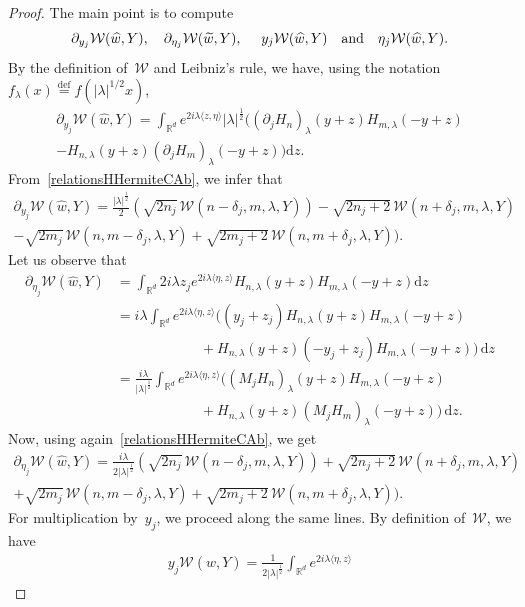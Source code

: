 \documentclass[10pt]{amsart}
\theoremstyle{definition}\newtheorem{defi}[theo]{Definition}\newtheorem{rema}[theo]{Remark}\newtheorem{exam}[theo]{Example}\newtheorem{exem}[theo]{Example}\newtheorem{nota}[theo]{Notation}
\newcommand{\lam}{\lambda}
\newcommand{\wt}{\widetilde}
\newcommand{\wh}{\widehat}
\newcommand*\cW{\mathcal{W}}
\newcommand*\R{\mathbb{R}}
\newcommand{\andf}{\quad\hbox{and}\quad}
\newcommand*\eqdefa{\overset{\mathrm{def}}{=}}
\newcommand*{\dd}{\mathrm{d}}
\newcommand{\dz}{\dd z}
\begin{document}
\begin{proof}
The main point is to compute
\[
\partial_{y_j} \cW(\wh w,Y),\quad\partial_{\eta_j} \cW(\wt w,Y),\quad\ y_j \cW(\wh w,Y)\andf \eta_j \cW(\wh w,Y).
\]
By the definition of~$\cW$ and Leibniz's rule, we have, using the notation $f_\lam(x)\eqdefa f(|\lam|^{1/2}x)$,
\begin{multline*}
\partial_{y_j} \cW(\wh w,Y) = \int_{\R^d} e^{2i\lam\langle z,\eta\rangle } |\lam|^{\frac 12}
\Big((\partial_jH_n)_{\lam} (y+z) H_{m,\lam} (-y+z) \\ -H_{n,\lam} (y+z) (\partial_jH_m)_\lam (-y+z) \Big)\dz.
\end{multline*}
From~\eqref{relationsHHermiteCAb}, we infer that
\begin{multline}\label{actionX_jonFHdemoeq1}
\!\!\partial_{y_j} \cW(\wh w,Y) = \frac {|\lam|^{\frac 12}} 2 (\sqrt {2n_j}\, \cW(n\!-\!\delta_j,m,\lam,Y)) -\sqrt {2n_j\!+\!2}\, \cW(n\!+\!\delta_j,m,\lam,Y) \\
-\sqrt {2m_j}\,\cW(n,m-\delta_j,\lam,Y) +\sqrt {2m_j+2}\,\cW(n,m+\delta_j,\lam,Y)).\!\!
\end{multline}
Let us observe that
\[
\begin{aligned}
\partial_{\eta_j} \cW(\wh w,Y) & = \int_{\R^d} 2i\lam z_j e^{2i\lam\langle \eta,z\rangle} H_{n,\lam}(y+z)H_{m,\lam} (-y+z) \dz\\
& = i\lam \int_{\R^d} e^{2i\lam\langle \eta,z\rangle}((y_j+z_j) H_{n,\lam}(y+z)H_{m,\lam} (-y+z) \\
& \qquad\qquad\qquad + H_{n,\lam}(y+z)(-y_j+z_j)H_{m,\lam} (-y+z))\,\dz\\
&= \frac {i\lam} {|\lam|^{\frac 12} }\int_{\R^d}e^{2i\lam\langle \eta,z\rangle} ((M_jH_{n})_\lam(y+z)H_{m,\lam} (-y+z) \\
& \qquad\qquad\qquad +H_{n,\lam}(y+z) (M_jH_m)_\lam(-y+z))\,\dz.
\end{aligned}
\]
Now, using again~\eqref{relationsHHermiteCAb}, we get
\begin{multline}\label{actionX_jonFHdemoeq2}
\partial_{\eta_j} \cW(\wh w,Y) \!= \frac {i\lam} {2|\lam|^{\frac 12} }(\sqrt {2n_j}\, \cW(n\!-\!\delta_j,m,\lam,Y) )
\!+\!\sqrt {2n_j\!+\!2}\, \cW(n\!+\!\delta_j,m,\lam,Y) \\
+\sqrt {2m_j}\,\cW(n,m-\delta_j,\lam,Y) +\sqrt {2m_j+2}\,\cW(n,m+\delta_j,\lam,Y)).
\end{multline}
For multiplication by~$y_j$, we proceed along the same lines. By definition of~$\cW$, we have
\begin{multline*}
y_j\cW(\wh w,Y) =\frac 1 {2|\lam|^{\frac12}}\! \int_{\R^d}\! e^{2i\lam\langle \eta,z\rangle}

\end{multline*}
\end{proof}
\end{document}
